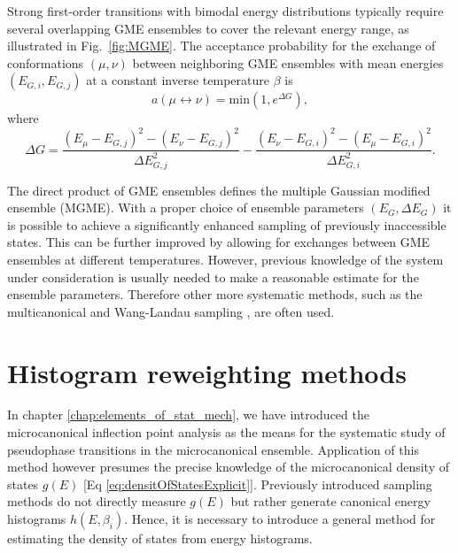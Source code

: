 \documentclass[12pt]{report}
\begin{document}
Strong first-order transitions with bimodal energy distributions typically
require several overlapping GME ensembles to cover the relevant energy range, as illustrated in Fig.~\ref{fig:MGME}. The acceptance probability for the
exchange of conformations $(\mu,\nu)$ between neighboring GME ensembles with mean energies $(E_{G,i}, E_{G,j})$ at a constant inverse temperature $\beta$ is
%
\begin{equation}
a\left(\mu \leftrightarrow \nu \right) = 	
\mathrm{min}\left(1,e^{\Delta G}\right),
\end{equation}
%
where
\begin{equation}
\Delta G  = 
\frac{\left(E_{\mu} - E_{G,j}\right)^{2}-\left(E_{\nu}-
E_{G,j}\right)^{2}}{\Delta E_{G,j}^{2}} - \frac{\left(E_{\nu} - 	
E_{G,i}\right)^{2}-\left(E_{\mu} - E_{G,i}\right)^{2}}{\Delta E_{G,i}^{2}}.
\end{equation}

The direct product of GME ensembles defines the multiple Gaussian modified ensemble (MGME). With a proper choice of ensemble parameters $(E_{G},\Delta E_{G})$ it is possible to achieve a significantly enhanced sampling of previously inaccessible states. This can be further improved by allowing for exchanges between GME ensembles at different temperatures. However, previous knowledge of the system under consideration is usually needed to make a reasonable estimate for the ensemble parameters. Therefore other more systematic methods, such as the multicanonical \cite{muca1a,muca1b,muca2,muca3,muca4,Bachmann2013} and Wang-Landau sampling \cite{wl1,wl2,wl3}, are often used.    


\section{Histogram reweighting methods}

In chapter \ref{chap:elements_of_stat_mech}, we have introduced the microcanonical inflection point analysis as the means for the systematic study of pseudophase transitions in the microcanonical ensemble. Application of this method however presumes the precise knowledge of the microcanonical density of states $g(E)$ [Eq \ref{eq:densitOfStatesExplicit}]. Previously introduced sampling methods do not directly measure $g(E)$ but rather generate canonical energy histograms $h(E,\beta_{i})$. Hence, it is necessary to introduce a general method for estimating the density of states from energy histograms.
\end{document}
